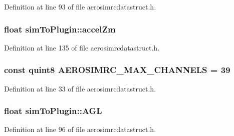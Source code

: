 \-Definition at line 93 of file aerosimrcdatastruct.\-h.

\hypertarget{group___aero_sim_r_c_ga15b5242cd24b1253d8fa5a12d07e3b76}{
\subsubsection[{accel\-Zm}]{\setlength{\rightskip}{0pt plus 5cm}float {\bf sim\-To\-Plugin\-::accel\-Zm}}}\label{group___aero_sim_r_c_ga15b5242cd24b1253d8fa5a12d07e3b76}


\-Definition at line 135 of file aerosimrcdatastruct.\-h.

\hypertarget{group___aero_sim_r_c_ga63f989ac10cdcbfefadc5e65055d3c7d}{
\subsubsection[{\-A\-E\-R\-O\-S\-I\-M\-R\-C\-\_\-\-M\-A\-X\-\_\-\-C\-H\-A\-N\-N\-E\-L\-S}]{\setlength{\rightskip}{0pt plus 5cm}const quint8 {\bf \-A\-E\-R\-O\-S\-I\-M\-R\-C\-\_\-\-M\-A\-X\-\_\-\-C\-H\-A\-N\-N\-E\-L\-S} = 39}}\label{group___aero_sim_r_c_ga63f989ac10cdcbfefadc5e65055d3c7d}


\-Definition at line 33 of file aerosimrcdatastruct.\-h.

\hypertarget{group___aero_sim_r_c_gadaa747e1f33381fce539ba3df9915281}{
\subsubsection[{\-A\-G\-L}]{\setlength{\rightskip}{0pt plus 5cm}float {\bf sim\-To\-Plugin\-::\-A\-G\-L}}}\label{group___aero_sim_r_c_gadaa747e1f33381fce539ba3df9915281}


\-Definition at line 96 of file aerosimrcdatastruct.\-h.


